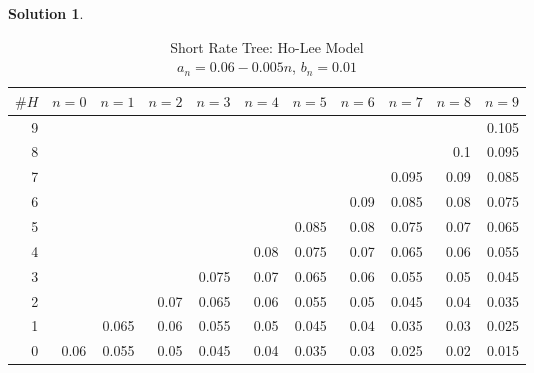 \documentclass[a4paper, 10pt]{article}
\theoremstyle{definition}
\theoremstyle{hSol}
\newtheorem*{solution}{Solution}
\begin{document}
\begin{solution}
\begin{landscape}
\begin{table}[htbp]
  \small
  \centering
  \caption{Short Rate Tree: Ho-Lee Model \\ $a_n=0.06-0.005n$, $b_n=0.01$}
    \begin{tabular}{|r|rrrrrrrrrr|}
    \hline
    $\#H$& $n=0$     & $n=1$     & $n=2$     & $n=3$     & $n=4$     & $n=5$     & $n=6$     & $n=7$     & $n=8$     & $n=9$     \\
    \hline
    9     &       &       &       &       &       &       &       &       &       & 0.105 \\
    8     &       &       &       &       &       &       &       &       & 0.1   & 0.095 \\
    7     &       &       &       &       &       &       &       & 0.095 & 0.09  & 0.085 \\
    6     &       &       &       &       &       &       & 0.09  & 0.085 & 0.08  & 0.075 \\
    5     &       &       &       &       &       & 0.085 & 0.08  & 0.075 & 0.07  & 0.065 \\
    4     &       &       &       &       & 0.08  & 0.075 & 0.07  & 0.065 & 0.06  & 0.055 \\
    3     &       &       &       & 0.075 & 0.07  & 0.065 & 0.06  & 0.055 & 0.05  & 0.045 \\
    2     &       &       & 0.07  & 0.065 & 0.06  & 0.055 & 0.05  & 0.045 & 0.04  & 0.035 \\
    1     &       & 0.065 & 0.06  & 0.055 & 0.05  & 0.045 & 0.04  & 0.035 & 0.03  & 0.025 \\
    0     & 0.06  & 0.055 & 0.05  & 0.045 & 0.04  & 0.035 & 0.03  & 0.025 & 0.02  & 0.015 \\
    \hline
    \end{tabular}%
  \label{tab:hltree}%
\end{table}%



\end{landscape}
\end{solution}
\end{document}
